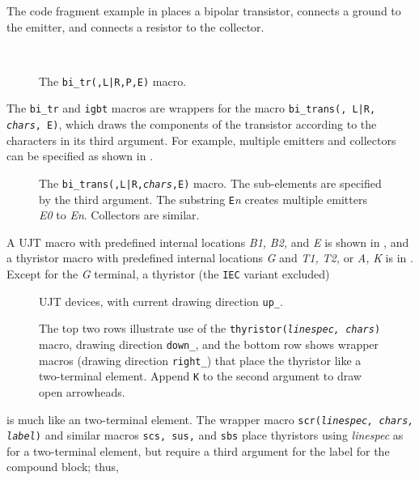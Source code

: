 The code fragment example in  places a bipolar transistor,
connects a ground to the emitter, and connects a resistor to the collector.
\begin{figure}[ht]
   \quad\quad\parbox{4in}{\small }%
   \quad\raise-0.4in\hbox{ }%
   \vspace{-\baselineskip}
   \caption{The {\tt bi\_tr(\linespec,L|R,P,E)} macro.}
   \label{bitr}
   \end{figure}

The {\tt bi\_tr} and {\tt igbt} macros are wrappers for
the macro {\tt bi\_trans(\linespec, L|R, {\sl chars}, E)}, which
draws the components of the transistor according to the characters in its
third argument.  For example, multiple emitters and collectors can be
specified as shown in .
\begin{figure}[ht]
   
   \caption{The {\tt bi\_trans(\linespec,L|R,{\sl chars},E)} macro.
   The sub-elements are specified by the third argument.  The substring
   {\tt E}{\sl n} creates multiple emitters {\sl E0} to {\sl En}.
   Collectors are similar.}
   \label{bitrans}
   \end{figure}

\pagebreak
A UJT macro with predefined internal locations {\sl B1,} {\sl B2,}
and {\sl E} is shown in ,
and a thyristor macro with predefined internal locations
 {\sl G} and {\sl T1,} {\sl T2,} or
 {\sl A,} {\sl K} is in .
Except for the {\sl G} terminal, a thyristor (the {\tt IEC} variant excluded)
\begin{figure}[ht]
   
   \caption{UJT devices, with current drawing direction {\tt up\_}. }
   \label{ujt}
   \end{figure}
\begin{figure}[h!t]
   
   \vspace*{-1ex}
   \caption{The top two rows illustrate use of the
    {\tt thyristor({\sl linespec, chars})} macro,
    drawing direction {\tt down\_}, and the bottom row shows wrapper
    macros (drawing direction {\tt right\_}) that place
    the thyristor like a two-terminal element. Append {\tt K}
    to the second argument to draw open arrowheads.}
   \label{thyristor}
   \end{figure}
is much like an two-terminal element.  The wrapper macro
{\tt scr({\sl linespec, chars, label})} and similar macros
{\tt scs, sus,} and {\tt sbs} place thyristors
using {\sl linespec} as for a two-terminal element,
but require a third argument for the label for the compound block; thus,

